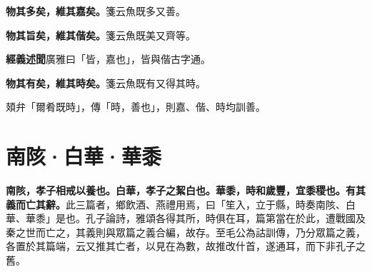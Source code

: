 \textbf{物其多矣，維其嘉矣。}{\footnotesize 箋云魚既多又善。}

\textbf{物其旨矣，維其偕矣。}{\footnotesize 箋云魚既美又齊等。}

\begin{quoting}\textbf{經義述聞}廣雅曰「皆，嘉也」，皆與偕古字通。\end{quoting}

\textbf{物其有矣，維其時矣。}{\footnotesize 箋云魚既有又得其時。}

\begin{quoting}頍弁「爾肴既時」，傳「時，善也」，則嘉、偕、時均訓善。\end{quoting}

\section{南陔·白華·華黍}

\textbf{南陔，孝子相戒以養也。白華，孝子之絜白也。華黍，時和歲豐，宜黍稷也。有其義而亡其辭。}{\footnotesize 此三篇者，鄉飲酒、燕禮用焉，曰「笙入，立于縣，時奏南陔、白華、華黍」是也。孔子論詩，雅頌各得其所，時俱在耳，篇第當在於此，遭戰國及秦之世而亡之，其義則與眾篇之義合編，故存。至毛公為詁訓傳，乃分眾篇之義，各置於其篇端，云又推其亡者，以見在為數，故推改什首，遂通耳，而下非孔子之舊。}

